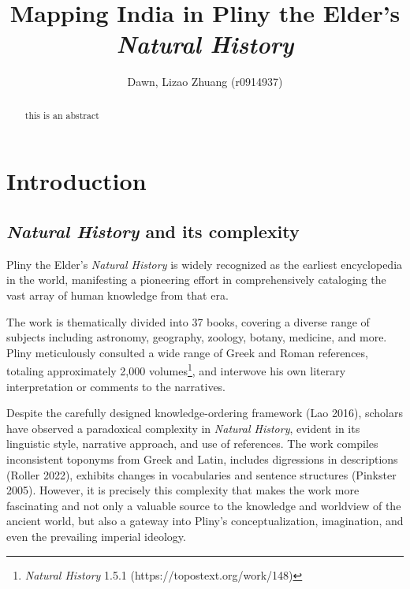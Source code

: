 \documentclass[
  12pt,
]{article}
\title{Mapping India in Pliny the Elder's \emph{Natural History}}
\author{Dawn, Lizao Zhuang (r0914937)}
\date{}
\renewcommand*\contentsname{Table of contents}
\newcommand\contentsname{Table of contents}
\begin{document}
\maketitle
\begin{abstract}
this is an abstract
\end{abstract}
\ifdefined\Shaded\renewenvironment{Shaded}{\begin{tcolorbox}[breakable, boxrule=0pt, frame hidden, borderline west={3pt}{0pt}{shadecolor}, enhanced, interior hidden, sharp corners]}{\end{tcolorbox}}\fi

\renewcommand*\contentsname{Contents}
{
\hypersetup{linkcolor=}
\setcounter{tocdepth}{3}
\tableofcontents
}
\listoffigures
\listoftables
\hypertarget{sec-introduction}{%
\section{Introduction}\label{sec-introduction}}

\hypertarget{natural-history-and-its-complexity}{%
\subsection{\texorpdfstring{\emph{Natural History} and its
complexity}{Natural History and its complexity}}\label{natural-history-and-its-complexity}}

Pliny the Elder's \emph{Natural History} is widely recognized as the
earliest encyclopedia in the world, manifesting a pioneering effort in
comprehensively cataloging the vast array of human knowledge from that
era.

The work is thematically divided into 37 books, covering a diverse range
of subjects including astronomy, geography, zoology, botany, medicine,
and more. Pliny meticulously consulted a wide range of Greek and Roman
references, totaling approximately 2,000 volumes\footnote{\emph{Natural
  History} 1.5.1 (https://topostext.org/work/148)}, and interwove his
own literary interpretation or comments to the narratives.

Despite the carefully designed knowledge-ordering framework (Lao 2016),
scholars have observed a paradoxical complexity in \emph{Natural
History}, evident in its linguistic style, narrative approach, and use
of references. The work compiles inconsistent toponyms from Greek and
Latin, includes digressions in descriptions (Roller 2022), exhibits
changes in vocabularies and sentence structures (Pinkster 2005).
However, it is precisely this complexity that makes the work more
fascinating and not only a valuable source to the knowledge and
worldview of the ancient world, but also a gateway into Pliny's
conceptualization, imagination, and even the prevailing imperial
ideology.
\end{document}
